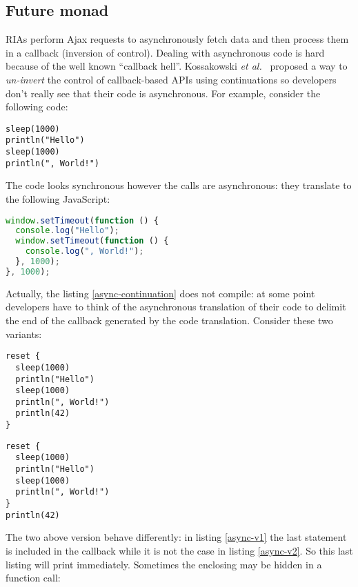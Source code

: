\documentclass[american,english,runningheads]{llncs}
\newcommand{\etal}{\emph{et al.~}}
\begin{document}
\subsection{Future monad}

RIAs perform Ajax requests to asynchronously fetch data and then process them in a callback (inversion of control). Dealing with asynchronous code is hard because of the well known “callback hell”. Kossakowski \etal{} proposed a way to \emph{un-invert} the control of callback-based APIs using continuations so developers don’t really see that their code is asynchronous. For example, consider the following code:
\begin{lstlisting}[label=async-continuation,caption=Asynchronous computations using continuations]
sleep(1000)
println("Hello")
sleep(1000)
println(", World!")
\end{lstlisting}

The code looks synchronous however the  calls are asynchronous: they translate to the following JavaScript:

\begin{lstlisting}[language=JavaScript,label=async-js,caption=Generated code for listing \ref{async-continuation}]
window.setTimeout(function () {
  console.log("Hello");
  window.setTimeout(function () {
    console.log(", World!");
  }, 1000);
}, 1000);
\end{lstlisting}

Actually, the listing \ref{async-continuation} does not compile: at some point developers have to think of the asynchronous translation of their code to delimit the end of the callback generated by the code translation. Consider these two variants:

\begin{lstlisting}[label=async-v1,caption=Version 1]
reset {
  sleep(1000)
  println("Hello")
  sleep(1000)
  println(", World!")
  println(42)
}
\end{lstlisting}
\begin{lstlisting}[label=async-v2,caption=Version 2]
reset {
  sleep(1000)
  println("Hello")
  sleep(1000)
  println(", World!")
}
println(42)
\end{lstlisting}

The two above version behave differently: in listing \ref{async-v1} the last  statement is included in the callback while it is not the case in listing \ref{async-v2}. So this last listing will print  immediately. Sometimes the enclosing  may be hidden in a function call:
\end{document}
